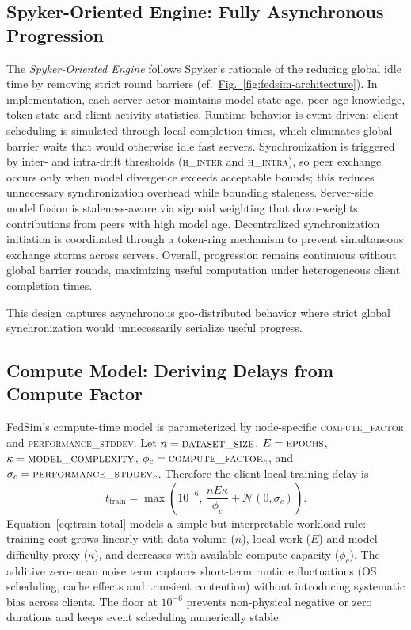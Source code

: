 \documentclass[conference]{IEEEtran}
\newcommand{\figref}[1]{\hyperref[#1]{Fig.~\ref*{#1}}}
\begin{document}
\subsection{Spyker-Oriented Engine: Fully Asynchronous Progression}
The \textit{Spyker-Oriented Engine} follows Spyker's rationale of the reducing global idle time by removing strict round barriers \cite{zuo2024} (cf.\ \figref{fig:fedsim-architecture}). In implementation, each server actor maintains model state age, peer age knowledge, token state and client activity statistics. Runtime behavior is event-driven: client scheduling is simulated through local completion times, which eliminates global barrier waits that would otherwise idle fast servers. Synchronization is triggered by inter- and intra-drift thresholds (\textsc{h\_inter} and \textsc{h\_intra}), so peer exchange occurs only when model divergence exceeds acceptable bounds; this reduces unnecessary synchronization overhead while bounding staleness. Server-side model fusion is staleness-aware via sigmoid weighting that down-weights contributions from peers with high model age. Decentralized synchronization initiation is coordinated through a token-ring mechanism to prevent simultaneous exchange storms across servers. Overall, progression remains continuous without global barrier rounds, maximizing useful computation under heterogeneous client completion times.

This design captures asynchronous geo-distributed behavior where strict global synchronization would unnecessarily serialize useful progress.

\subsection{Compute Model: Deriving Delays from Compute Factor}
FedSim's compute-time model is parameterized by node-specific \textsc{compute\_factor} and \textsc{performance\_stddev}. Let
$n=\textsc{dataset\_size}$, $E=\textsc{epochs}$, $\kappa=\textsc{model\_complexity}$,
$\phi_c=\textsc{compute\_factor}_c$, and $\sigma_c=\textsc{performance\_stddev}_c$.
Therefore the client-local training delay is
\begin{equation}
t_{\mathrm{train}}=\max\!\left(10^{-6},\,\frac{nE\kappa}{\phi_c}+\mathcal{N}(0,\sigma_c)\right).
\label{eq:train-total}
\end{equation}
Equation~\ref{eq:train-total} models a simple but interpretable workload rule: training cost grows linearly with data volume ($n$), local work ($E$) and model difficulty proxy ($\kappa$), and decreases with available compute capacity ($\phi_c$). The additive zero-mean noise term captures short-term runtime fluctuations (OS scheduling, cache effects and transient contention) without introducing systematic bias across clients. The floor at $10^{-6}$ prevents non-physical negative or zero durations and keeps event scheduling numerically stable.
\end{document}
